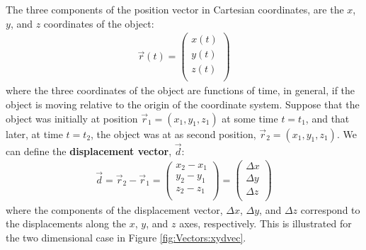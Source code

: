 The three components of the position vector in Cartesian coordinates, are the $x$, $y$, and $z$ coordinates of the object:
\begin{align*}
\vec r(t) = \begin{pmatrix}
           x(t) \\
           y(t) \\
           z(t) \\
         \end{pmatrix}
\end{align*}  
where the three coordinates of the object are functions of time, in general, if the object is moving relative to the origin of the coordinate system. Suppose that the object was initially at position $\vec r_1=(x_1, y_1, z_1)$ at some time $t=t_1$, and that later, at time $t=t_2$, the object was at as second position, $\vec r_2=(x_1, y_1, z_1)$. We can define the \textbf{displacement vector}, $\vec  d$:
\begin{align*}
 \vec d = \vec r_2 - \vec r_1 =\begin{pmatrix}
           x_2-x_1 \\
           y_2-y_1 \\
           z_2-z_1 \\
         \end{pmatrix} = \begin{pmatrix}
           \Delta x \\
           \Delta y \\
           \Delta z \\
         \end{pmatrix}
\end{align*}
where the components of the displacement vector, $\Delta x$, $\Delta y$, and $\Delta z$ correspond to the displacements along the $x$, $y$, and $z$ axes, respectively. This is illustrated for the two dimensional case in Figure \ref{fig:Vectors:xydvec}.



